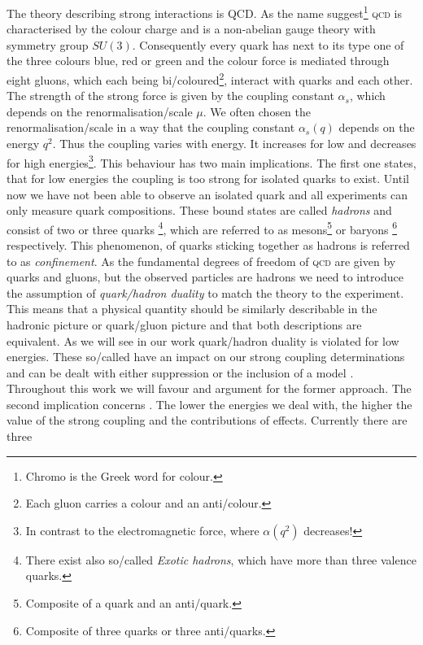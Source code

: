 \documentclass[../../index.tex]{subfiles}
\begin{document}
The theory describing strong interactions is \textsc{QCD}. As the name
suggest\footnote{Chromo is the Greek word for colour.} \textsc{qcd} is
characterised by the colour charge and is a non-abelian gauge theory with
symmetry group $SU(3)$. Consequently every quark has next to its type one of the
three colours blue, red or green and the colour force is mediated through eight
gluons, which each being bi\-/coloured\footnote{Each gluon carries a colour and
  an anti\-/colour.}, interact with quarks and each other. The strength of the
strong force is given by the coupling constant $\alpha_s$, which depends on the
renormalisation\-/scale $\mu$. We often chosen the renormalisation\-/scale in a
way that the coupling constant $\alpha_s(q)$ depends on the energy $q^2$. Thus
the coupling varies with energy. It increases for low and decreases for high
energies\footnote{In contrast to the electromagnetic force, where $\alpha(q^2)$
  decreases!}. This behaviour has two main implications. The first one states,
that for low energies the coupling is too strong for isolated quarks to exist.
Until now we have not been able to observe an isolated quark and all experiments
can only measure quark compositions. These bound states are called
\textit{hadrons} and consist of two or three quarks \footnote{There exist also
  so\-/called \textit{Exotic hadrons}, which have more than three valence
  quarks.}, which are referred to as mesons\footnote{Composite of a quark and an
  anti\-/quark.} or baryons \footnote{Composite of three quarks or three
  anti\-/quarks.} respectively. This phenomenon, of quarks sticking together as
hadrons is referred to as \textit{confinement}. As the fundamental degrees of
freedom of \textsc{qcd} are given by quarks and gluons, but the observed
particles are hadrons we need to introduce the assumption of
\textit{quark\-/hadron duality} to match the theory to the experiment. This
means that a physical quantity should be similarly describable in the hadronic
picture or quark\-/gluon picture and that both descriptions are equivalent. As
we will see in our work quark\-/hadron duality is violated for low energies.
These so\-/called  have an impact on our strong
coupling determinations and can be dealt with either suppression or the
inclusion of a model \cite{Cata2008}. Throughout this work we will
favour and argument for the former approach. The second implication concerns
. The lower the energies we deal with, the
higher the value of the strong coupling and the contributions of
 effects. Currently there are three
\end{document}
